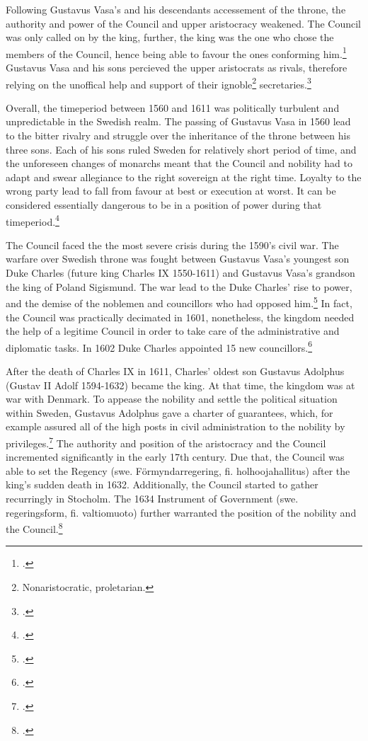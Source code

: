 Following Gustavus Vasa's and his descendants accessement of the throne, the authority and power of the Council and upper aristocracy weakened. The Council was only called on by the king, further, the king was the one who chose the members of the Council, hence being able to favour the ones conforming him.\footcite[p. 58.]{pSuurvalta} Gustavus Vasa and his sons percieved the upper aristocrats as rivals, therefore relying on the unoffical help and support of their ignoble\footnote{Nonaristocratic, proletarian.} secretaries.\footcite[p. 53.]{HakanenAKoskinen2017}

Overall, the timeperiod between 1560 and 1611 was politically turbulent and unpredictable in the Swedish realm. The passing of Gustavus Vasa in 1560 lead to the bitter rivalry and struggle over the inheritance of the throne between his three sons. Each of his sons ruled Sweden for relatively short period of time, and the unforeseen changes of monarchs meant that the Council and nobility had to adapt and swear allegiance to the right sovereign at the right time. Loyalty to the wrong party lead to fall from favour at best or execution at worst. It can be considered essentially dangerous to be in a position of power during that timeperiod.\footcites[p. 96-121,]{pSuurvalta}[p. 51-52.]{HakanenAKoskinen2017}

The Council faced the the most severe crisis during the 1590's civil war. The warfare over Swedish throne was fought between Gustavus Vasa's youngest son Duke Charles (future king Charles IX 1550-1611) and Gustavus Vasa's grandson the king of Poland Sigismund. The war lead to the Duke Charles' rise to power, and the demise of the noblemen and councillors who had opposed him.\footcites[p. 57-60,]{HakanenAKoskinen2017}[p. 96-121.]{pSuurvalta} In fact, the Council was practically decimated in 1601, nonetheless, the kingdom needed the help of a legitime Council in order to take care of the administrative and diplomatic tasks. In 1602 Duke Charles appointed 15 new councillors.\footcite[p. 57-59.]{HakanenAKoskinen2017}

After the death of Charles IX in 1611, Charles' oldest son Gustavus Adolphus (Gustav II Adolf 1594-1632) became the king. At that time, the kingdom was at war with Denmark. To appease the nobility and settle the political situation within Sweden, Gustavus Adolphus gave a charter of guarantees, which, for example assured all of the high posts in civil administration to the nobility by privileges.\footcites[p. 121-123,]{pSuurvalta}[p. 8-9.]{personalAgency} The authority and position of the aristocracy and the Council incremented significantly in the early 17th century. Due that, the Council was able to set the Regency (swe. Förmyndarregering, fi. holhoojahallitus) after the king's sudden death in 1632. Additionally, the Council started to gather recurringly in Stocholm. The 1634 Instrument of Government (swe. regeringsform, fi. valtiomuoto) further warranted the position of the nobility and the Council.\footcites[p. 195-197,]{pSuurvalta}[p. 16-17,]{agencyAndStateBuilding}[p. 8-9.]{personalAgency}

